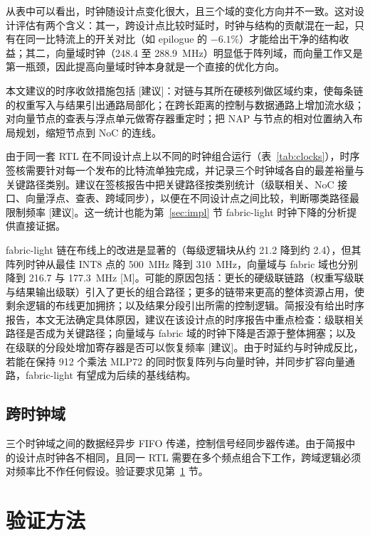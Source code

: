 \documentclass[a4paper,10.5pt]{ctexart}
\newcommand{\tM}{\textsf{[M]}}              %
\newcommand{\tR}{\textsf{[建议]}}           %
\begin{document}
从表中可以看出，时钟随设计点变化很大，且三个域的变化方向并不一致。这对设计评估有两个含义：其一，跨设计点比较时延时，时钟与结构的贡献混在一起，只有在同一比特流上的开关对比（如 epilogue 的 $-6.1\%$）才能给出干净的结构收益；其二，向量域时钟（248.4 至 288.9~MHz）明显低于阵列域，而向量工作又是第一瓶颈，因此提高向量域时钟本身就是一个直接的优化方向。

本文建议的时序收敛措施包括 \tR：对链与其所在硬核列做区域约束，使每条链的权重写入与结果引出通路局部化；在跨长距离的控制与数据通路上增加流水级；对向量节点的查表与浮点单元做寄存器重定时；把 NAP 与节点的相对位置纳入布局规划，缩短节点到 NoC 的连线。

由于同一套 RTL 在不同设计点上以不同的时钟组合运行（表~\ref{tab:clocks}），时序签核需要针对每一个发布的比特流单独完成，并记录三个时钟域各自的最差裕量与关键路径类别。建议在签核报告中把关键路径按类别统计（级联相关、NoC 接口、向量浮点、查表、跨域同步），以便在不同设计点之间比较，判断哪类路径最限制频率 \tR。这一统计也能为第~\ref{sec:impl} 节 fabric-light 时钟下降的分析提供直接证据。

fabric-light 链在布线上的改进是显著的（每级逻辑块从约 21.2 降到约 2.4），但其阵列时钟从最佳 INT8 点的 500~MHz 降到 310~MHz，向量域与 fabric 域也分别降到 216.7 与 177.3~MHz \tM。可能的原因包括：更长的硬级联链路（权重写级联与结果输出级联）引入了更长的组合路径；更多的链带来更高的整体资源占用，使剩余逻辑的布线更加拥挤；以及结果分段引出所需的控制逻辑。简报没有给出时序报告，本文无法确定具体原因，建议在该设计点的时序报告中重点检查：级联相关路径是否成为关键路径；向量域与 fabric 域的时钟下降是否源于整体拥塞；以及在级联的分段处增加寄存器是否可以恢复频率 \tR。由于时延约与时钟成反比，若能在保持 912 个乘法 MLP72 的同时恢复阵列与向量时钟，并同步扩容向量通路，fabric-light 有望成为后续的基线结构。

\subsection{跨时钟域}

三个时钟域之间的数据经异步 FIFO 传递，控制信号经同步器传递。由于简报中的设计点时钟各不相同，且同一 RTL 需要在多个频点组合下工作，跨域逻辑必须对频率比不作任何假设。验证要求见第~\ref{sec:verif} 节。


\section{验证方法}\label{sec:verif}
\end{document}
